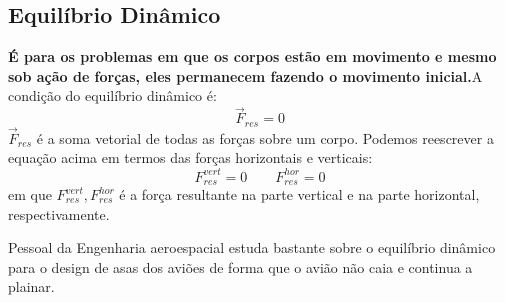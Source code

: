 \documentclass[12pt]{extarticle}
\newcommand{\<}{\langle}
\renewcommand{\>}{\rangle}
\theoremstyle{definition}
\begin{document}
\subsection{Equilíbrio Dinâmico}
\textbf{É para os problemas em que os corpos estão em movimento e mesmo sob ação de forças, eles permanecem fazendo o movimento inicial.}A condição do equilíbrio dinâmico é:
\begin{equation}
    \vec{F}_{res} =0
\end{equation}
\noindent $\vec{F}_{res}$ é a soma vetorial de todas as forças sobre um corpo. Podemos reescrever a equação acima em termos das forças horizontais e verticais:
\begin{equation}
    F_{res}^{vert} = 0 \quad \quad F_{res}^{hor} = 0
\end{equation}
\noindent em que $F_{res}^{vert},F_{res}^{hor}$ é a força resultante na parte vertical e na parte horizontal, respectivamente.

Pessoal da Engenharia aeroespacial estuda bastante sobre o equilíbrio dinâmico para o design de asas dos aviões de forma que o avião não caia e continua a plainar.
\end{document}
